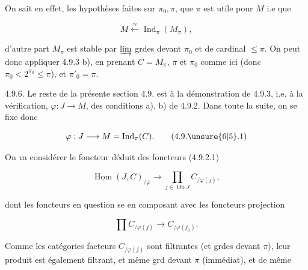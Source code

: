 
On sait en effet,  les hypothèses faites sur $\pi_0,\pi$, que  $\pi$ est utile pour $M$ i.e que

\[
M\xleftarrow{\approx}\operatorname{Ind}_{\pi}(M_{\pi}),
\]

d'autre part $M_\pi$ est stable par $\varinjlim$ grdes devant $\pi_0$ et de cardinal $\leq\pi$. On peut donc appliquer 4.9.3 b), en prenant $C=M_{\pi}$, $\pi$ et $\pi_0$ comme ici (donc $\pi_0<2^{\pi_0}\leq\pi$), et $\pi'_0=\pi$.


4.9.6. Le reste de la présente section 4.9. est  à la démonstration de 4.9.3, i.e. à la vérification,  $\varphi:J\longrightarrow M$, des conditions a), b) de 4.9.2. Dans toute la suite, on se fixe donc 

\[
\varphi:J\longrightarrow M=\operatorname{Ind}_{\pi}(C).\tag*{(4.9.\unsure{6|5}.1)}
\]


On va considérer le foncteur déduit des foncteurs (4.9.2.1)

\[
\underline{\operatorname{Hom}}(J,C)_{/\varphi}\longrightarrow\prod_{j\in\operatorname{Ob}J} C_{/\varphi(j)},\tag*{(4.9.6.2)}
\]

dont les foncteurs en question se  en composant avec les foncteurs projection

\[
\prod C_{/\varphi(j)}\longrightarrow C_{/\varphi(j_0)}.\tag*{(4.9.6.3)}
\]

Comme les catégories facteurs $C_{/\varphi(j)}$ sont filtrantes (et  grdes devant $\pi$), leur produit est également filtrant, et même grd devant $\pi$ (immédiat), et de même
